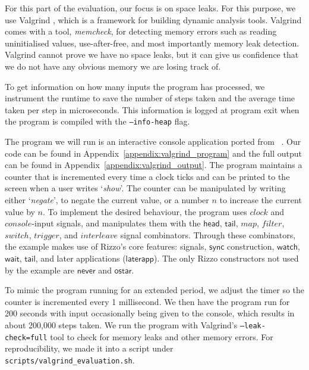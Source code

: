 
For this part of the evaluation, our focus is on space leaks. For this purpose, we use Valgrind \cite{valgrind}, which is a framework for building dynamic analysis tools.
Valgrind comes with a tool, \textit{memcheck}, for detecting memory errors such as reading uninitialised values, use-after-free, and most importantly memory leak detection. Valgrind cannot prove we have no space leaks, but it can give us confidence that we do not have any obvious memory we are losing track of.

To get information on how many inputs the program has processed, we instrument the runtime to save the number of steps taken and the average time taken per step in microseconds. 
This information is logged at program exit when the program is compiled with the \texttt{--info-heap} flag.

The program we will run is an interactive console application ported from \citeauthor*{gebser_asynchronous_2023}~\cite{gebser_asynchronous_2023}. Our code can be found in Appendix~\ref{appendix:valgrind_program} and the full output can be found in Appendix~\ref{appendix:valgrind_output}.
The program maintains a counter that is incremented every time a clock ticks and can be printed to the screen when a user writes `\textit{show}'. The counter can be manipulated by writing either `\textit{negate}', to negate the current value, or a number $n$ to increase the current value by $n$. 
To implement the desired behaviour, the program uses $clock$ and $console$-input signals, and manipulates them with the $\mathsf{head}$, $\mathsf{tail}$, $map$, $filter$, $switch$, $trigger$, and $interleave$ signal combinators. Through these combinators, the example makes use of Rizzo's core features: signals, $\mathsf{sync}$ construction, $\mathsf{watch}$, $\mathsf{wait}$, $\mathsf{tail}$, and later applications ($\mathsf{laterapp}$). The only Rizzo constructors not used by the example are $\mathsf{never}$ and $\mathsf{ostar}$.

To mimic the program running for an extended period, we adjust the timer so the counter is incremented every 1 millisecond. We then have the program run for 200 seconds with input occasionally being given to the console, which results in about 200,000 steps taken. We run the program with Valgrind's \texttt{--leak-check=full} tool to check for memory leaks and other memory errors. For reproducibility, we made it into a script under \texttt{scripts/valgrind\_evaluation.sh}.

